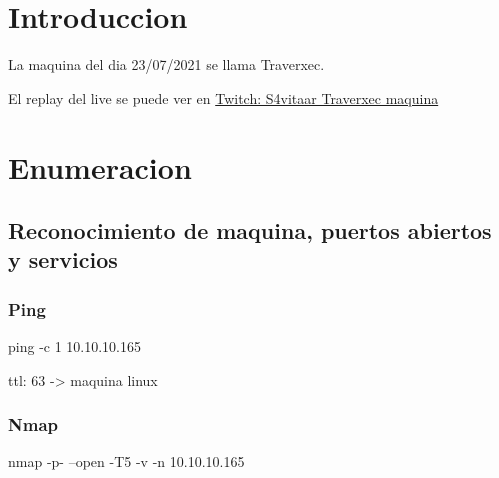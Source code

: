 \documentclass{assets/ipesethesis}
\newenvironment{Shaded}{\begin{snugshade}}{\end{snugshade}}
\newcommand{\FunctionTok}[1]{\textcolor[rgb]{0.00,0.00,0.00}{#1}}
\newcommand{\NormalTok}[1]{#1}
\begin{document}
\hypertarget{introduccion-1}{%
\section*{Introduccion}\label{introduccion-1}}

La maquina del dia 23/07/2021 se llama Traverxec.

El replay del live se puede ver en \href{https://www.twitch.tv/videos/1095841567}{Twitch: S4vitaar Traverxec maquina}

\hypertarget{enumeracion-1}{%
\section*{Enumeracion}\label{enumeracion-1}}

\hypertarget{reconocimiento-de-maquina-puertos-abiertos-y-servicios-1}{%
\subsection*{Reconocimiento de maquina, puertos abiertos y servicios}\label{reconocimiento-de-maquina-puertos-abiertos-y-servicios-1}}

\hypertarget{ping-1}{%
\subsubsection*{Ping}\label{ping-1}}

\begin{Shaded}
\begin{Highlighting}[]
\FunctionTok{ping}\NormalTok{ -c 1 10.10.10.165}
\end{Highlighting}
\end{Shaded}

ttl: 63 -\textgreater{} maquina linux

\hypertarget{nmap-1}{%
\subsubsection*{Nmap}\label{nmap-1}}

\begin{Shaded}
\begin{Highlighting}[]
\FunctionTok{nmap}\NormalTok{ -p- --open -T5 -v -n 10.10.10.165}
\end{Highlighting}
\end{Shaded}
\end{document}
